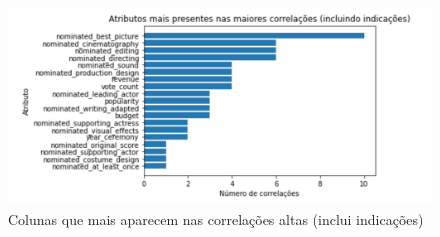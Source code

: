 
        \begin{figure}[htb]
        	\caption{\label{colunas_influentes_1}Colunas que mais aparecem nas correlações altas (inclui indicações)}
        	\begin{center}
        		\includegraphics[scale=0.7]{colunas_influentes_1.png}
        	\end{center}
        \end{figure}

        


